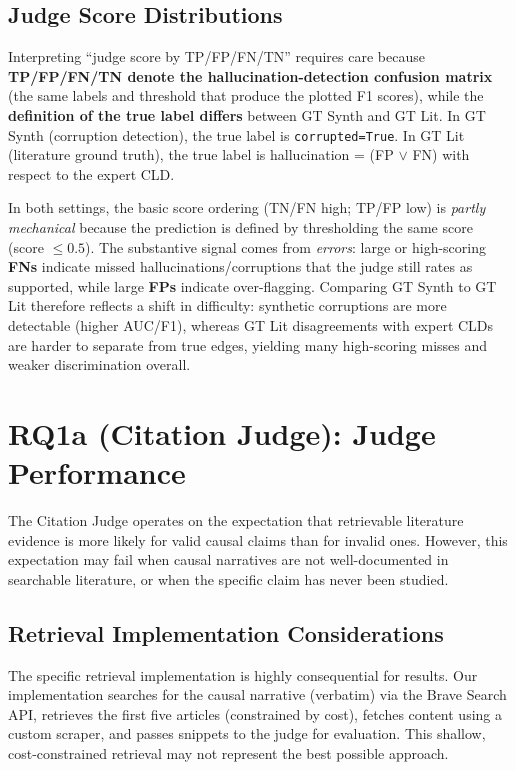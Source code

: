 \subsection{Judge Score Distributions}

Interpreting ``judge score by TP/FP/FN/TN'' requires care because \textbf{TP/FP/FN/TN denote the hallucination-detection confusion matrix} (the same labels and threshold that produce the plotted F1 scores), while the \textbf{definition of the true label differs} between GT Synth and GT Lit. In GT Synth (corruption detection), the true label is \texttt{corrupted=True}. In GT Lit (literature ground truth), the true label is hallucination = (FP $\lor$ FN) with respect to the expert CLD.

In both settings, the basic score ordering (TN/FN high; TP/FP low) is \textit{partly mechanical} because the prediction is defined by thresholding the same score (score $\le 0.5$). The substantive signal comes from \textit{errors}: large or high-scoring \textbf{FNs} indicate missed hallucinations/corruptions that the judge still rates as supported, while large \textbf{FPs} indicate over-flagging. Comparing GT Synth to GT Lit therefore reflects a shift in difficulty: synthetic corruptions are more detectable (higher AUC/F1), whereas GT Lit disagreements with expert CLDs are harder to separate from true edges, yielding many high-scoring misses and weaker discrimination overall.

\section{RQ1a (Citation Judge): Judge Performance}
\label{sec:discussion_rq1a_citation}

The Citation Judge operates on the expectation that retrievable literature evidence is more likely for valid causal claims than for invalid ones. However, this expectation may fail when causal narratives are not well-documented in searchable literature, or when the specific claim has never been studied.

\subsection{Retrieval Implementation Considerations}

The specific retrieval implementation is highly consequential for results. Our implementation searches for the causal narrative (verbatim) via the Brave Search API, retrieves the first five articles (constrained by cost), fetches content using a custom scraper, and passes snippets to the judge for evaluation. This shallow, cost-constrained retrieval may not represent the best possible approach.

